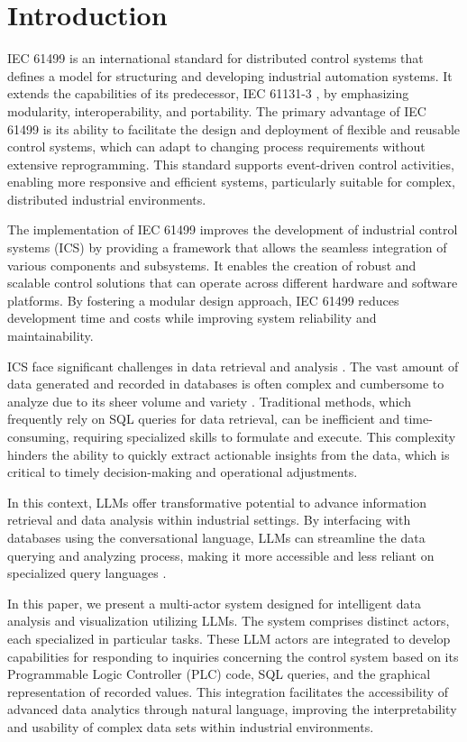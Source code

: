 \documentclass[conference]{IEEEtran}
\begin{document}
\section{Introduction}

IEC 61499 \cite{iec61499part12012} is an international standard for distributed control systems that defines a model for structuring and developing industrial automation systems. It extends the capabilities of its predecessor, IEC 61131-3 \cite{tiegelkamp2010iec}, by emphasizing modularity, interoperability, and portability. The primary advantage of IEC 61499 is its ability to facilitate the design and deployment of flexible and reusable control systems, which can adapt to changing process requirements without extensive reprogramming. This standard supports event-driven control activities, enabling more responsive and efficient systems, particularly suitable for complex, distributed industrial environments.

The implementation of IEC 61499 \cite{vyatkin2009iec} improves the development of industrial control systems (ICS) by providing a framework that allows the seamless integration of various components and subsystems. It enables the creation of robust and scalable control solutions that can operate across different hardware and software platforms. By fostering a modular design approach, IEC 61499 reduces development time and costs while improving system reliability and maintainability. 

ICS face significant challenges in data retrieval and analysis \cite{cho2023dynamic}. The vast amount of data generated and recorded in databases is often complex and cumbersome to analyze due to its sheer volume and variety \cite{stojanovic2020challenges}. Traditional methods, which frequently rely on SQL queries for data retrieval, can be inefficient and time-consuming, requiring specialized skills to formulate and execute. This complexity hinders the ability to quickly extract actionable insights from the data, which is critical to timely decision-making and operational adjustments.

In this context, LLMs \cite{chang2024survey} offer transformative potential to advance information retrieval and data analysis within industrial settings. By interfacing with databases using the conversational language, LLMs can streamline the data querying and analyzing process, making it more accessible and less reliant on specialized query languages \cite{rajkumar2022evaluating}. 

In this paper, we present a multi-actor system designed for intelligent data analysis and visualization utilizing LLMs. The system comprises distinct actors, each specialized in particular tasks. These LLM actors are integrated to develop capabilities for responding to inquiries concerning the control system based on its Programmable Logic Controller (PLC) code, SQL queries, and the graphical representation of recorded values. This integration facilitates the accessibility of advanced data analytics through natural language, improving the interpretability and usability of complex data sets within industrial environments.
\end{document}
